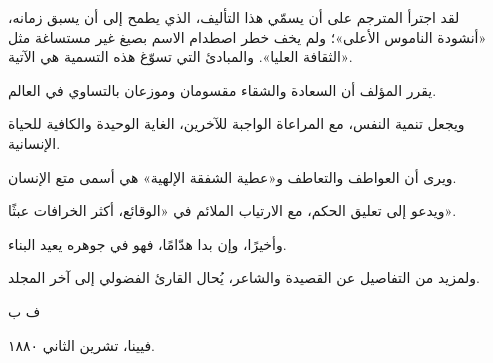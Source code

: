 
لقد اجترأ المترجم على أن يسمّي هذا التأليف، الذي يطمح إلى أن يسبق زمانه، «أنشودة الناموس الأعلى»؛ ولم يخف خطر اصطدام الاسم بصيغ غير مستساغة مثل «الثقافة العليا». والمبادئ التي تسوّغ هذه التسمية هي الآتية.

يقرر المؤلف أن السعادة والشقاء مقسومان وموزعان بالتساوي في العالم.

ويجعل تنمية النفس، مع المراعاة الواجبة للآخرين، الغاية الوحيدة والكافية للحياة الإنسانية.

ويرى أن العواطف والتعاطف و«عطية الشفقة الإلهية» هي أسمى متع الإنسان.

ويدعو إلى تعليق الحكم، مع الارتياب الملائم في «الوقائع، أكثر الخرافات عبثًا».

وأخيرًا، وإن بدا هدّامًا، فهو في جوهره يعيد البناء.

ولمزيد من التفاصيل عن القصيدة والشاعر، يُحال القارئ الفضولي إلى آخر المجلد.

ف ب

فيينا، تشرين الثاني ١٨٨٠.
